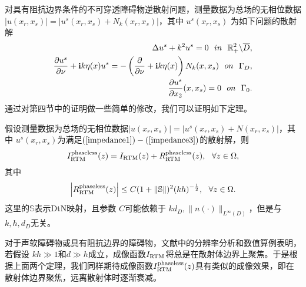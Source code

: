 对具有阻抗边界条件的不可穿透障碍物逆散射问题，测量数据为总场的无相位数据 $|u(x_r,x_s)|=
|u^s(x_r,x_s)+N_k(x_r,x_s)|$，其中 $u^s(x_r,x_s)$ 为如下问题的散射解
\begin{eqnarray}
 \Delta u^s+k^2u^s=0\ \ in\ \ \R^2_+\backslash\overline{D},\label{impedance1}\\
\frac{\partial u^s}{\partial\nu}+\ii k\eta(x)u^s=
-\left(\frac{\partial}{\partial\nu}+\ii k\eta(x)\right)N_k(x,x_s)\ \ on\ \ \Gamma_D,\\
\frac{\partial u^s}{\partial x_2}(x,x_s)=0\ \ on\ \ \Gamma_0\label{impedance3}.
\end{eqnarray}
通过对第四节中的证明做一些简单的修改，我们可以证明如下定理。
\begin{theorem}\label{thM:5.1}
假设测量数据为总场的无相位数据$|u(x_r,x_s)|=|u^s(x_r,x_s)+N(x_r,x_s)|$，其中 $u^s(x_r,x_s)$为满足$(\ref{impedance1})
-(\ref{impedance3})$的散射解，则
\begin{equation*}
  I^{\rm phaseless}_{\rm RTM}(z)=I_{\rm RTM}(z)+ R^{\rm phaseless}_{\rm RTM}(z),\ \ \forall z\in\Omega,
\end{equation*}
其中$$\left| R^{\rm phaseless}_{\rm RTM}(z)\right|\leq C(1 + \|\mathbb{S}\|)^2(kh)^{-\frac{1}{2}},\ \ \forall z\in\Omega.$$
这里的$\mathbb{S}$表示DtN映射，且参数 $C$可能依赖于 $kd_D, \|n(\cdot)\|_{L^\infty(D)}$，但是与$k,h,d_D$无关。
\end{theorem}
对于声软障碍物或具有阻抗边界的障碍物，文献\cite{ch_ha}中的分辨率分析和数值算例表明，若假设 $kh\gg 1$和$d\gg h$成立，成像函数$I_{\rm RTM}$将总是在散射体边界上聚焦。于是根据上面两个定理，我们同样期待成像函数$I^{\rm phaseless}_{\rm RTM}(z)$具有类似的成像效果，即在散射体边界聚焦，远离散射体时逐渐衰减。
